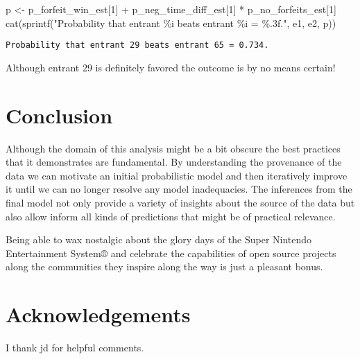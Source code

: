 \documentclass[
  letterpaper,
  DIV=11,
  numbers=noendperiod]{scrartcl}
\newenvironment{Shaded}{\begin{snugshade}}{\end{snugshade}}
\newcommand{\DecValTok}[1]{\textcolor[rgb]{0.68,0.00,0.00}{#1}}
\newcommand{\FunctionTok}[1]{\textcolor[rgb]{0.28,0.35,0.67}{#1}}
\newcommand{\NormalTok}[1]{\textcolor[rgb]{0.00,0.23,0.31}{#1}}
\newcommand{\OtherTok}[1]{\textcolor[rgb]{0.00,0.23,0.31}{#1}}
\newcommand{\SpecialCharTok}[1]{\textcolor[rgb]{0.37,0.37,0.37}{#1}}
\newcommand{\StringTok}[1]{\textcolor[rgb]{0.13,0.47,0.30}{#1}}
\begin{document}
\begin{Shaded}
\begin{Highlighting}[]
\NormalTok{p }\OtherTok{\textless{}{-}}\NormalTok{ p\_forfeit\_win\_est[}\DecValTok{1}\NormalTok{] }\SpecialCharTok{+}\NormalTok{ p\_neg\_time\_diff\_est[}\DecValTok{1}\NormalTok{] }\SpecialCharTok{*}\NormalTok{ p\_no\_forfeits\_est[}\DecValTok{1}\NormalTok{]}
\FunctionTok{cat}\NormalTok{(}\FunctionTok{sprintf}\NormalTok{(}\StringTok{"Probability that entrant \%i beats entrant \%i = \%.3f."}\NormalTok{,}
\NormalTok{            e1, e2, p))}
\end{Highlighting}
\end{Shaded}

\begin{verbatim}
Probability that entrant 29 beats entrant 65 = 0.734.
\end{verbatim}

Although entrant 29 is definitely favored the outcome is by no means
certain!

\section{Conclusion}\label{conclusion}

Although the domain of this analysis might be a bit obscure the best
practices that it demonstrates are fundamental. By understanding the
provenance of the data we can motivate an initial probabilistic model
and then iteratively improve it until we can no longer resolve any model
inadequacies. The inferences from the final model not only provide a
variety of insights about the source of the data but also allow inform
all kinds of predictions that might be of practical relevance.

Being able to wax nostalgic about the glory days of the Super Nintendo
Entertainment System® and celebrate the capabilities of open source
projects along the communities they inspire along the way is just a
pleasant bonus.

\section*{Acknowledgements}\label{acknowledgements}

I thank jd for helpful comments.
\end{document}

